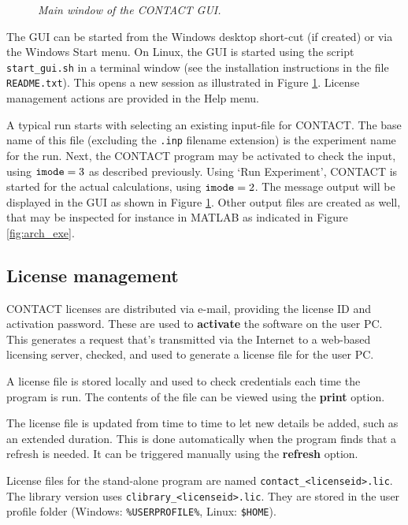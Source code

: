 \documentclass[12pt]{report}
\begin{document}
\begin{figure}[bt]
\centering
{}
\caption{\em Main window of the CONTACT GUI.}
\label{fig:screenshot_gui}
\end{figure}

The GUI can be started from the Windows desktop short-cut (if created) or
via the Windows Start menu. On Linux, the GUI is started using the script
{\tt start\_gui.sh} in a terminal window (see the installation instructions
in the file {\tt README.txt}). This opens a new session as illustrated in
Figure \ref{fig:screenshot_gui}. License management actions are provided in
the Help menu.

A typical run starts with selecting an existing input-file for CONTACT.
The base name of this file (excluding the {\tt .inp} filename extension) is
the experiment name for the run. Next, the CONTACT program may be activated
to check the input, using ${\tt imode}=3$ as described previously. Using
`Run Experiment', CONTACT is started for the actual calculations, using
${\tt imode}=2$. The message output will be displayed in the GUI as shown
in Figure \ref{fig:screenshot_gui}. Other output files are created as
well, that may be inspected for instance in MATLAB as indicated in
Figure \ref{fig:arch_exe}.

\subsection{License management}
\label{sec:license_mngmt}

CONTACT licenses are distributed via e-mail, providing the license ID
and activation password. These are used to {\bf activate} the software on
the user PC. This generates a request that's transmitted via the Internet
to a web-based licensing server, checked, and used to generate a license
file for the user PC. 

A license file is stored locally and used to check credentials each
time the program is run. The contents of the file can be viewed using the
{\bf print} option.

The license file is updated from time to time to let new details be added,
such as an extended duration. This is done automatically when the program
finds that a refresh is needed. It can be triggered manually using the {\bf
refresh} option.

License files for the stand-alone program are named
\verb+contact_<licenseid>.lic+. The library version uses 
\verb+clibrary_<licenseid>.lic+. They are stored in
the user profile folder (Windows: \verb+%USERPROFILE%+, Linux:
\verb+$HOME+). 
\end{document}
